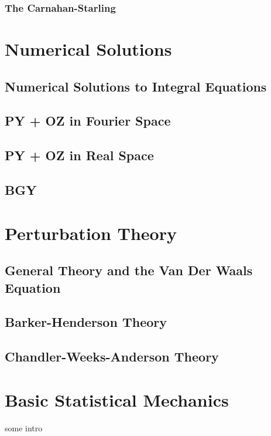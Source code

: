 \documentclass[a4paper,11pt]{article}
\begin{document}
\subsubsection{The Carnahan-Starling}

\section{Numerical Solutions}
\subsection{Numerical Solutions to Integral Equations}

\subsection{PY + OZ in Fourier Space}

\subsection{PY + OZ in Real Space}

\subsection{BGY}


\section{Perturbation Theory}
\subsection{General Theory and the Van Der Waals Equation}
\subsection{Barker-Henderson Theory}
\subsection{Chandler-Weeks-Anderson Theory}

\appendix

\section{Basic Statistical Mechanics}\label{sec:basic}

some intro
\end{document}
